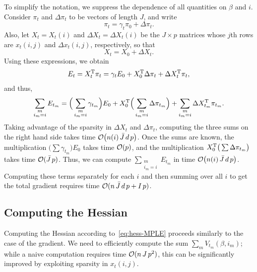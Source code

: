 \documentclass[final]{statsoc}
\begin{document}
To simplify the notation, we suppress the dependence of all quantities on $\beta$ and $i$.
Consider $\pi_t$ and $\Delta \pi_t$ to be vectors of length $J$, and write
\[
    \pi_t = \gamma_t \pi_0 + \Delta \pi_t.
\]
Also, let $X_t = X_t(i)$ and $\Delta X_t = \Delta X_t(i)$ be the $J \times p$ matrices
whose $j$th rows are $x_t(i,j)$ and $\Delta x_t(i,j)$, respectively, so
that
\[
  X_t = X_0 + \Delta X_t.
\]
Using these expressions, we obtain
\[
  E_t = X_t^{\mathrm{T}} \pi_t
      = \gamma_t E_0
      + X_0^{\mathrm{T}} \Delta \pi_t
      + \Delta X_t^{\mathrm{T}} \pi_t,
\]
and thus,
\[
  \sum_{\substack{m  \\ i_m = i}} E_{t_m} =
    \Big(\sum_{\substack{ m \\ i_m = i}} \gamma_{t_m}\Big) E_0
    +
    X_0^{\mathrm{T}} \Big(\sum_{\substack{ m \\ i_m = i }} \Delta \pi_{t_m}\Big)
    +
    \sum_{\substack{m \\ i_m = i}} \Delta X_{t_m}^{\mathrm{T}} \pi_{t_m}.
\]
Taking advantage of the sparsity in $\Delta X_t$ and $\Delta \pi_t$, computing
the three sums on the right hand side takes time $\mathcal{O}\big(n(i) \,
\bar J \, d \, p\big)$.  Once the sums are known, the multiplication
$\Big(\sum \gamma_{t_m}\Big) E_0$ takes time $\mathcal{O}(p)$, and the
multiplication $X_0^{\mathrm{T}} \big( \sum \Delta \pi_{t_m}\big)$ takes time
$\mathcal{O}(\bar J \, p)$.  Thus, we can compute $\sum_{\substack{m \\ i_m = i}} E_{t_m}$ in time
$\mathcal{O}\big(n(i) \, \bar J \, d \, p\big)$.  Computing these terms separately for
each $i$ and then summing over all $i$ to get the total gradient requires time $\mathcal{O}(n
\, \bar J \, d \, p + I \, p)$.


\subsection{Computing the Hessian}

Computing the Hessian according to~\eqref{eq:hess-MPLE} proceeds similarly to the case of the
gradient.  We need to efficiently compute the sum $\sum_m V_{t_m}(\beta,
i_m)$; while a naive computation requires time $\mathcal{O}(n \, J \, p^2)$, this can be significantly improved by exploiting sparsity in $x_t(i,j)$.
\end{document}
